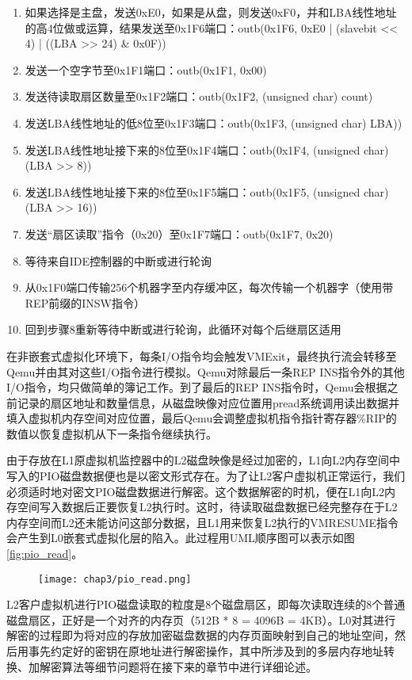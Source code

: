 \begin{enumerate}
\item 如果选择是主盘，发送0xE0，如果是从盘，则发送0xF0，并和LBA线性地址的高4位做或运算，结果发送至0x1F6端口：outb(0x1F6, 0xE0 | (slavebit << 4) | ((LBA >> 24) \& 0x0F))
\item 发送一个空字节至0x1F1端口：outb(0x1F1, 0x00)
\item 发送待读取扇区数量至0x1F2端口：outb(0x1F2, (unsigned char) count)
\item 发送LBA线性地址的低8位至0x1F3端口：outb(0x1F3, (unsigned char) LBA))
\item 发送LBA线性地址接下来的8位至0x1F4端口：outb(0x1F4, (unsigned char)(LBA >> 8))
\item 发送LBA线性地址接下来的8位至0x1F5端口：outb(0x1F5, (unsigned char)(LBA >> 16))
\item 发送``扇区读取''指令（0x20）至0x1F7端口：outb(0x1F7, 0x20)
\item 等待来自IDE控制器的中断或进行轮询
\item 从0x1F0端口传输256个机器字至内存缓冲区，每次传输一个机器字（使用带REP前缀的INSW指令）
\item 回到步骤8重新等待中断或进行轮询，此循环对每个后继扇区适用
\end{enumerate}

在非嵌套式虚拟化环境下，每条I/O指令均会触发VMExit，最终执行流会转移至Qemu并由其对这些I/O指令进行模拟。Qemu对除最后一条REP INS指令外的其他I/O指令，均只做简单的簿记工作。到了最后的REP INS指令时，Qemu会根据之前记录的扇区地址和数量信息，从磁盘映像对应位置用pread系统调用读出数据并填入虚拟机内存空间对应位置，最后Qemu会调整虚拟机指令指针寄存器\%RIP的数值以恢复虚拟机从下一条指令继续执行。

由于存放在L1原虚拟机监控器中的L2磁盘映像是经过加密的，L1向L2内存空间中写入的PIO磁盘数据便也是以密文形式存在。为了让L2客户虚拟机正常运行，我们必须适时地对密文PIO磁盘数据进行解密。这个数据解密的时机，便在L1向L2内存空间写入数据后正要恢复L2执行时。这时，待读取磁盘数据已经完整存在于L2内存空间而L2还未能访问这部分数据，且L1用来恢复L2执行的VMRESUME指令会产生到L0嵌套式虚拟化层的陷入。此过程用UML顺序图可以表示如图\ref{fig:pio_read}。

\begin{figure}[!htbp]
  \centering
  \texttt{[image: chap3/pio\_read.png]}
\end{figure}

L2客户虚拟机进行PIO磁盘读取的粒度是8个磁盘扇区，即每次读取连续的8个普通磁盘扇区，正好是一个对齐的内存页（512B * 8 = 4096B = 4KB）。L0对其进行解密的过程即为将对应的存放加密磁盘数据的内存页面映射到自己的地址空间，然后用事先约定好的密钥在原地址进行解密操作，其中所涉及到的多层内存地址转换、加解密算法等细节问题将在接下来的章节中进行详细论述。


